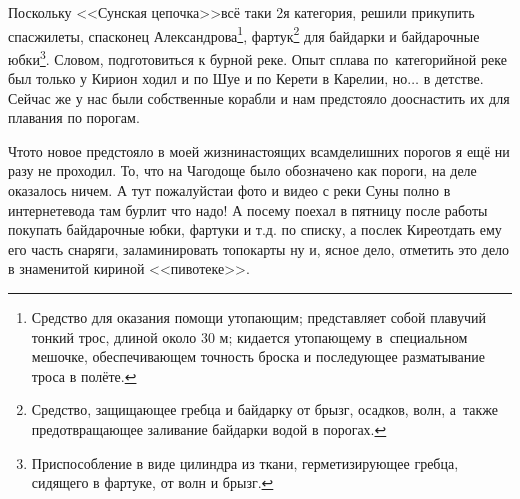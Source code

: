 {\renewcommand*{\thefootnote}{\arabic{footnote}}
Поскольку <<Сунская цепочка>>\mdash всё таки 2\sdash я категория, решили прикупить спасжилеты, спасконец Александрова\footnote[1]{Средство для оказания помощи утопающим; представляет собой плавучий тонкий трос, длиной около 30 м; кидается утопающему в~специальном мешочке, обеспечивающем точность броска и последующее разматывание троса в полёте.}, фартук\footnote[2]{Средство, защищающее гребца и байдарку от брызг, осадков, волн, а~также предотвращающее заливание байдарки водой в порогах.} для байдарки и байдарочные юбки\footnote[3]{Приспособление в виде цилиндра из ткани, герметизирующее гребца, сидящего в фартуке, от волн и брызг.}. Словом, подготовиться к бурной реке. Опыт сплава по~категорийной реке был только у Кири\mdash он ходил и по Шуе и по Керети в Карелии, но$\ldots$ в детстве. Сейчас же у нас были собственные корабли и нам предстояло дооснастить их для плавания по порогам. 

Что\sdash то новое предстояло в моей жизни\mdash настоящих всамделишних порогов я ещё ни разу не проходил. То, что на Чагодоще было обозначено как пороги, на деле оказалось ничем. А тут пожалуйста\mdash и фото и видео с реки Суны полно в интернете\mdash вода там бурлит что надо! А посему поехал в пятницу после работы покупать байдарочные юбки, фартуки и т.д. по списку, а после\mdash к Кире\mdash отдать ему его часть снаряги, заламинировать топокарты ну и, ясное дело, отметить это дело в знаменитой кириной <<пивотеке>>.





}